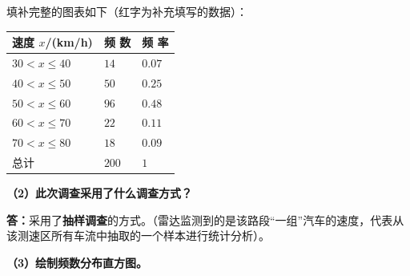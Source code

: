 \documentclass[12pt, a4paper]{ctexrep}
\begin{document}
填补完整的图表如下（红字为补充填写的数据）：

\vspace{0.4cm}
\begin{center}
\renewcommand{\arraystretch}{1.6}
\begin{tabular}{|>{\centering\arraybackslash}p{4.5cm}|>{\centering\arraybackslash}p{3cm}|>{\centering\arraybackslash}p{3cm}|}
\hline
\cellcolor{gray!15} 速度 $x$/(km/h) & \cellcolor{gray!15} 频 \quad 数 & \cellcolor{gray!15} 频 \quad 率 \\
\hline
$30 < x \leqslant 40$ & $14$ & $0.07$ \\
\hline
$40 < x \leqslant 50$ & $50$ & \textbf{\textcolor{red!70!black}{$0.25$}} \\
\hline
$50 < x \leqslant 60$ & \textbf{\textcolor{red!70!black}{$96$}} & $0.48$ \\
\hline
$60 < x \leqslant 70$ & \textbf{\textcolor{red!70!black}{$22$}} & \textbf{\textcolor{red!70!black}{$0.11$}} \\
\hline
$70 < x \leqslant 80$ & $18$ & $0.09$ \\
\hline
总计 & \textbf{\textcolor{red!70!black}{$200$}} & $1$ \\
\hline
\end{tabular}
\end{center}

\vspace{0.6cm}

\textbf{（2）此次调查采用了什么调查方式？}

\vspace{0.2cm}
\textbf{答：}采用了\textbf{抽样调查}的方式。（雷达监测到的是该路段“一组”汽车的速度，代表从该测速区所有车流中抽取的一个样本进行统计分析）。

\vspace{0.6cm}

\textbf{（3）绘制频数分布直方图。}
\end{document}
